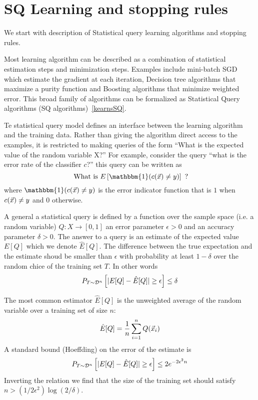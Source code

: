 \section{SQ Learning and stopping rules}\label{sec:tmsn}

We start with description of Statistical query learning algorithms and
stopping rules.

Most learning algorithm can be described as a combination of
statistical estimation steps and minimization steps. Examples include
mini-batch SGD which estimate the gradient at each iteration, Decision
tree algorithms that maximize a purity function and Boosting
algorithms that minimize weighted error. This broad family of
algorithms can be formalized as Statistical Query algorithms (SQ
algorithms)~\ref{kearnsSQ}.

Te statistical query model defines an interface between the learning
algorithm and the training data. Rather than giving the algorithm
direct access to the examples, it is restricted to making queries of
the form ``What is the expected value of the random variable X?''
For example, consider the query ``what is the error rate of the
classifier $c$?'' this query can be written as
$$\mbox{ What is } E\left[\mathbbm{1}(c(\vx)\neq y)\right] \mbox{ ?}$$
where $\mathbbm{1}(c(\vx)\neq y)$ is the error indicator function that is
$1$ when $c(\vec{x}) \neq y$ and $0$ otherwise.

A general a statistical query is defined by a function over the
sample space (i.e. a random variable) $Q:X \to [0,1]$ an error parameter
$\epsilon>0$ and an accuracy parameter $\delta>0$. The answer to a
query is an estimate of the expected value $E[Q]$ which we denote
$\hat{E}[Q]$. The difference between the true expectation and the
estimate shoud be smaller than $\epsilon$ with probability at least
$1-\delta$ over the random chice of the training set $T$. In other words
\[
P_{T \sim {\cal D}^n}\left[|E[Q] -\hat{E}[Q]| \geq \epsilon  \right] \leq \delta
\]

The most common estimator $\hat{E}[Q]$ is the unweighted average of the random
variable over a training set of size $n$:
\[
\hat{E}[Q] = \frac{1}{n} \sum_{i=1}^n Q(\vec{x}_i)
\]
A standard bound (Hoeffding) on the error of the estimate is
\begin{equation} \label{eqn:hoeffding}
P_{T \sim {\cal D}^n}\left[|E[Q] -\hat{E}[Q]| \geq \epsilon \right] \leq
2e^{-2 \epsilon^2 n}
\end{equation}
Inverting the relation we find that the size of the training set
should satisfy $n > (1/2 \epsilon^2)\log (2/\delta)$.

